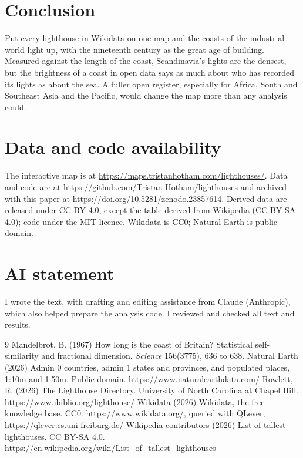 \documentclass[11pt,a4paper]{article}
\begin{document}
\section{Conclusion}
Put every lighthouse in Wikidata on one map and the coasts of the industrial world light up, with the nineteenth century as the great age of building. Measured against the length of the coast, Scandinavia's lights are the densest, but the brightness of a coast in open data says as much about who has recorded its lights as about the sea. A fuller open register, especially for Africa, South and Southeast Asia and the Pacific, would change the map more than any analysis could.

\section*{Data and code availability}
The interactive map is at \url{https://maps.tristanhotham.com/lighthouses/}. Data and code are at \url{https://github.com/Tristan-Hotham/lighthouses} and archived with this paper at https://doi.org/10.5281/zenodo.23857614. Derived data are released under CC BY 4.0, except the table derived from Wikipedia (CC BY-SA 4.0); code under the MIT licence. Wikidata is CC0; Natural Earth is public domain.

\section*{AI statement}
I wrote the text, with drafting and editing assistance from Claude (Anthropic), which also helped prepare the analysis code. I reviewed and checked all text and results.

\begin{thebibliography}{9}
 Mandelbrot, B. (1967) How long is the coast of Britain? Statistical self-similarity and fractional dimension. \emph{Science} 156(3775), 636 to 638.
 Natural Earth (2026) Admin 0 countries, admin 1 states and provinces, and populated places, 1:10m and 1:50m. Public domain. \url{https://www.naturalearthdata.com/}
 Rowlett, R. (2026) The Lighthouse Directory. University of North Carolina at Chapel Hill. \url{https://www.ibiblio.org/lighthouse/}
 Wikidata (2026) Wikidata, the free knowledge base. CC0. \url{https://www.wikidata.org/}, queried with QLever, \url{https://qlever.cs.uni-freiburg.de/}
 Wikipedia contributors (2026) List of tallest lighthouses. CC BY-SA 4.0. \url{https://en.wikipedia.org/wiki/List_of_tallest_lighthouses}
\end{thebibliography}
\end{document}
